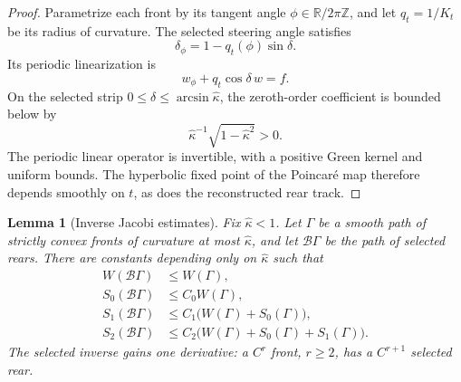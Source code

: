 \documentclass[11pt]{article}
\newtheorem{lemma}[theorem]{Lemma}
\theoremstyle{remark}
\newcommand{\Bmap}{\mathcal B}
\begin{document}
\begin{proof}
Parametrize each front by its tangent angle
\(\phi\in\mathbb R/2\pi\mathbb Z\), and let \(q_t=1/K_t\) be its radius of
curvature.  The selected steering angle satisfies
\[
   \delta_\phi=1-q_t(\phi)\sin\delta.
\]
Its periodic linearization is
\[
   w_\phi+q_t\cos\delta\,w=f.
\]
On the selected strip \(0\leq\delta\leq\arcsin\widehat\kappa\), the
zeroth-order coefficient is bounded below by
\[
   \widehat\kappa^{-1}\sqrt{1-\widehat\kappa^2}>0.
\]
The periodic linear operator is invertible, with a positive Green kernel and
uniform bounds.  The hyperbolic fixed point of the Poincar\'e map therefore
depends smoothly on \(t\), as does the reconstructed rear track.
\end{proof}

\begin{lemma}[Inverse Jacobi estimates]\label{lem:jacobi}
Fix $\widehat\kappa<1$.  Let $\Gamma$ be a smooth path of strictly convex
fronts of curvature at most $\widehat\kappa$, and let $\Bmap\Gamma$ be the
path of selected rears.  There are constants depending only on
$\widehat\kappa$ such that
\begin{align}
  W(\Bmap\Gamma)&\leq W(\Gamma),\label{eq:Wnonexp}\\
  S_0(\Bmap\Gamma)&\leq C_0W(\Gamma),\label{eq:S0gain}\\
  S_1(\Bmap\Gamma)&\leq C_1\bigl(W(\Gamma)+S_0(\Gamma)\bigr),\label{eq:S1gain}\\
  S_2(\Bmap\Gamma)&\leq C_2\bigl(W(\Gamma)+S_0(\Gamma)+S_1(\Gamma)\bigr).
  \label{eq:S2gain}
\end{align}
The selected inverse gains one derivative: a $C^r$ front, $r\geq2$, has a
$C^{r+1}$ selected rear.
\end{lemma}
\end{document}
